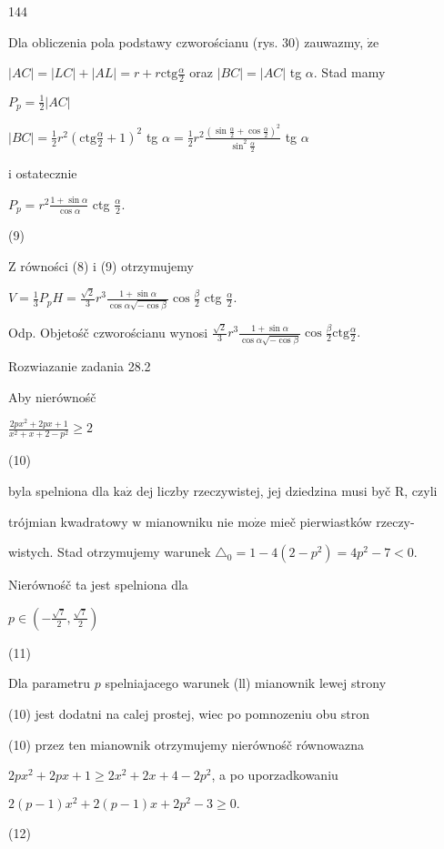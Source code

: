 \documentclass[a4paper,12pt]{article}
\begin{document}
144

Dla obliczenia pola podstawy czworościanu (rys. 30) zauwazmy, $\dot{\mathrm{z}}\mathrm{e}$

$|AC|=|LC|+|AL|=r+r\displaystyle \mathrm{c}\mathrm{t}\mathrm{g}\frac{\alpha}{2}$ oraz $|BC|=|AC|$ tg $\alpha$. Stad mamy

$P_{p}=\displaystyle \frac{1}{2}|AC|$

$|BC|=\displaystyle \frac{1}{2}r^{2}(\mathrm{c}\mathrm{t}\mathrm{g}\frac{\alpha}{2}+1)^{2}$ tg $\displaystyle \alpha=\frac{1}{2}r^{2}\frac{(\sin\frac{\alpha}{2}+\cos\frac{\alpha}{2})^{2}}{\sin^{2}\frac{\alpha}{2}}$ tg $\alpha$

$\mathrm{i}$ ostatecznie

$P_{p}=r^{2}\displaystyle \frac{1+\sin\alpha}{\cos\alpha}$ ctg $\displaystyle \frac{\alpha}{2}.$

(9)

$\mathrm{Z}$ równości (8) $\mathrm{i}$ (9) otrzymujemy

$V=\displaystyle \frac{1}{3}P_{p}H=\frac{\sqrt{2}}{3}r^{3}\frac{1+\sin\alpha}{\cos\alpha\sqrt{-\cos\beta}}\cos\frac{\beta}{2}$ ctg $\displaystyle \frac{\alpha}{2}.$

Odp. Objetośč czworościanu wynosi $\displaystyle \frac{\sqrt{2}}{3}r^{3}\frac{1+\sin\alpha}{\cos\alpha\sqrt{-\cos\beta}}\cos\frac{\beta}{2}\mathrm{c}\mathrm{t}\mathrm{g}\frac{\alpha}{2}.$

Rozwiazanie zadania 28.2

Aby nierównośč

$\displaystyle \frac{2px^{2}+2px+1}{x^{2}+x+2-p^{2}}\geq 2$

(10)

byla spelniona dla $\mathrm{k}\mathrm{a}\dot{\mathrm{z}}$ dej liczby rzeczywistej, jej dziedzina musi byč $\mathrm{R}$, czyli

trójmian kwadratowy $\mathrm{w}$ mianowniku nie $\mathrm{m}\mathrm{o}\dot{\mathrm{z}}\mathrm{e}$ mieč pierwiastków rzeczy-

wistych. Stad otrzymujemy warunek $\triangle_{0} = 1-4(2-p^{2}) =4p^{2}-7< 0.$

Nierównośč ta jest spelniona dla

$p\displaystyle \in(-\frac{\sqrt{7}}{2},\frac{\sqrt{7}}{2})$

(11)

Dla parametru $p$ spelniajacego warunek (ll) mianownik lewej strony

(10) jest dodatni na calej prostej, wiec po pomnozeniu obu stron

(10) przez ten mianownik otrzymujemy nierównośč równowazna

$2px^{2}+2px+1\geq 2x^{2}+2x+4-2p^{2}$, a po uporzadkowaniu

$2(p-1)x^{2}+2(p-1)x+2p^{2}-3\geq 0.$

(12)
\end{document}
